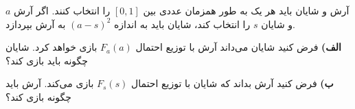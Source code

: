 آرش و شایان باید هر یک به طور همزمان عددی بین 
$[0, 1]$
را انتخاب کنند. اگر آرش
$a$
و شایان 
$s$
را انتخاب کند، شایان باید به اندازه 
$(a - s)^2$
به آرش بپردازد.
\vspace{10pt}

\textbf{الف)}
فرض کنید شایان می‌داند آرش با توزیع احتمال 
$F_a(a)$
بازی خواهد کرد. شایان چگونه باید بازی کند؟
\vspace{5pt}

\textbf{ب)}
فرض کنید آرش بداند که شایان با توزیع احتمال
$F_s(s)$
بازی می‌کند. آرش باید چگونه بازی کند؟
